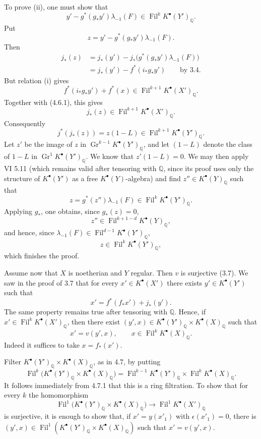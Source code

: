 \documentclass[11pt]{article}
\newcommand{\Fil}{\operatorname{Fil}}
\begin{document}
To prove (ii), one must show that
\[
  y'-g^*(g_*y')\lambda_{-1}(F)\in\Fil^kK^\bullet(Y')_{\mathbb Q}.
\]
Put
\[
  z=y'-g^*(g_*y')\lambda_{-1}(F).
\]
Then
\[
\begin{aligned}
j_*(z)
  &=j_*(y')-j_*\bigl(g^*(g_*y')\lambda_{-1}(F)\bigr)\\
  &=j_*(y')-f^*(i_*g_*y')\qquad\text{by 3.4.}
\end{aligned}
\]
But relation (i) gives
\[
  f^*(i_*g_*y')+f^*(x)\in\Fil^{k+1}K^\bullet(X')_{\mathbb Q}.
\]
Together with (4.6.1), this gives
\[
  j_*(z)\in\Fil^{k+1}K^\bullet(X')_{\mathbb Q}.
\]
Consequently
\[
  j^*(j_*(z))=z(1-L)\in\Fil^{k+1}K^\bullet(Y')_{\mathbb Q}.
\]
Let \(z'\) be the image of \(z\) in
\(\operatorname{Gr}^{k-1}K^\bullet(Y')_{\mathbb Q}\), and let \((1-L)\) denote the class of \(1-L\) in \(\operatorname{Gr}^{1}K^\bullet(Y')_{\mathbb Q}\). We know that \(z'(1-L)=0\). We may then apply VI 5.11 (which remains valid after tensoring with \(\mathbb Q\), since its proof uses only the structure of \(K^\bullet(Y')\) as a free \(K^\bullet(Y)\)-algebra) and find \(z''\in K^\bullet(Y)_{\mathbb Q}\) such that
\[
  z=g^*(z'')\lambda_{-1}(F)\in\Fil^kK^\bullet(Y')_{\mathbb Q}.
\]
Applying \(g_*\), one obtains, since \(g_*(z)=0\),
\[
  z''\in\Fil^{k+1-d}K^\bullet(Y)_{\mathbb Q},
\]
and hence, since \(\lambda_{-1}(F)\in\Fil^{d-1}K^\bullet(Y')_{\mathbb Q}\),
\[
  z\in\Fil^kK^\bullet(Y')_{\mathbb Q},
\]
which finishes the proof.

Assume now that \(X\) is noetherian and \(Y\) regular. Then \(v\) is surjective (3.7). We saw in the proof of 3.7 that for every \(x'\in K^\bullet(X')\) there exists \(y'\in K^\bullet(Y')\) such that
\[
  x'=f^*(f_*x')+j_*(y').
\]
The same property remains true after tensoring with \(\mathbb Q\). Hence, if \(x'\in\Fil^kK^\bullet(X')_{\mathbb Q}\), then there exist \((y',x)\in K^\bullet(Y')_{\mathbb Q}\times K^\bullet(X)_{\mathbb Q}\) such that
\[
  x'=v(y',x),\qquad x\in\Fil^kK^\bullet(X)_{\mathbb Q}.
\]
Indeed it suffices to take \(x=f_*(x')\).

Filter \(K^\bullet(Y')_{\mathbb Q}\times K^\bullet(X)_{\mathbb Q}\), as in 4.7, by putting
\[
  \Fil^k\bigl(K^\bullet(Y')_{\mathbb Q}\times K^\bullet(X)_{\mathbb Q}\bigr)
  =
  \Fil^{k-1}K^\bullet(Y')_{\mathbb Q}\times \Fil^kK^\bullet(X)_{\mathbb Q}.
\]
It follows immediately from 4.7.1 that this is a ring filtration. To show that for every \(k\) the homomorphism
\[
  \Fil^1\bigl(K^\bullet(Y')_{\mathbb Q}\times K^\bullet(X)_{\mathbb Q}\bigr)
  \longrightarrow
  \Fil^1K^\bullet(X')_{\mathbb Q}
\]
is surjective, it is enough to show that, if \(x'=y(x'_1)\) with \(\epsilon(x'_1)=0\), there is \((y',x)\in\Fil^1(K^\bullet(Y')_{\mathbb Q}\times K^\bullet(X)_{\mathbb Q})\) such that \(x'=v(y',x)\).
\end{document}

